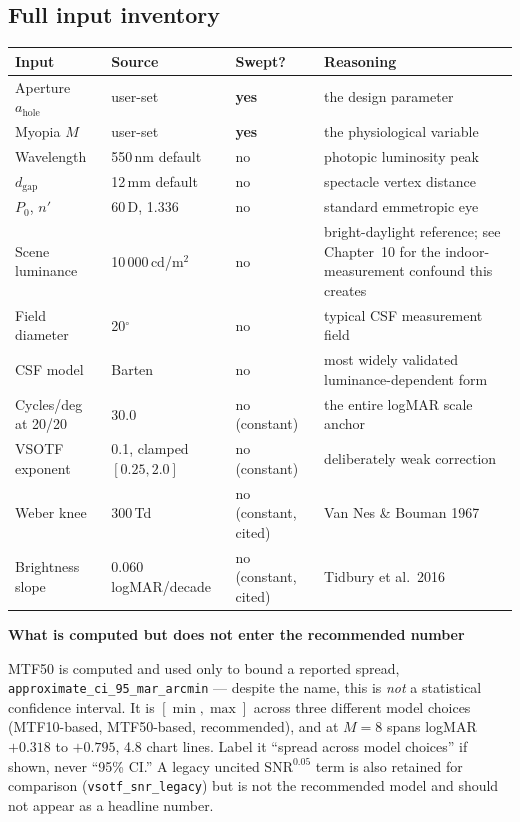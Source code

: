 \documentclass[11pt]{report}
\newenvironment{warnbox}[1]%
{\par\vspace{6pt}\begin{lrbox}{\wbsave}\begin{minipage}{0.88\textwidth}%
{\bfseries\color{warnred}#1}\par\vspace{4pt}\ignorespaces}%
{\end{minipage}\end{lrbox}%
\begin{center}\setlength{\fboxrule}{1.2pt}\setlength{\fboxsep}{7pt}%
\fcolorbox{warnred}{white}{\usebox{\wbsave}}\end{center}\vspace{6pt}\par}
\begin{document}
\subsection{Full input inventory}

\begin{center}
\begin{tabular}{p{3.2cm}p{2.6cm}p{2.4cm}p{4.6cm}}
\toprule
Input & Source & Swept? & Reasoning \\
\midrule
Aperture $a_{\text{hole}}$ & user-set & \textbf{yes} & the design parameter \\
Myopia $M$ & user-set & \textbf{yes} & the physiological variable \\
Wavelength & 550\,nm default & no & photopic luminosity peak \\
$d_{\text{gap}}$ & 12\,mm default & no & spectacle vertex distance \\
$P_0$, $n'$ & 60\,D, 1.336 & no & standard emmetropic eye \\
Scene luminance & 10\,000\,cd/m$^2$ & no & bright-daylight reference; see Chapter~10 for the
indoor-measurement confound this creates \\
Field diameter & 20$^\circ$ & no & typical CSF measurement field \\
CSF model & Barten & no & most widely validated luminance-dependent form \\
Cycles/deg at 20/20 & 30.0 & no (constant) & the entire logMAR scale anchor \\
VSOTF exponent & 0.1, clamped $[0.25,2.0]$ & no (constant) & deliberately weak correction \\
Weber knee & 300\,Td & no (constant, cited) & Van Nes \& Bouman 1967 \\
Brightness slope & 0.060\,logMAR/decade & no (constant, cited) & Tidbury et al.\ 2016 \\
\bottomrule
\end{tabular}
\end{center}

\begin{warnbox}{What is computed but does not enter the recommended number}
MTF50 is computed and used only to bound a reported spread,
\texttt{approximate\_ci\_95\_mar\_arcmin} --- despite the name, this is \emph{not} a
statistical confidence interval. It is $[\min,\max]$ across three different model choices
(MTF10-based, MTF50-based, recommended), and at $M=8$ spans logMAR $+0.318$ to $+0.795$,
4.8 chart lines. Label it ``spread across model choices'' if shown, never ``95\% CI.'' A
legacy uncited $\text{SNR}^{0.05}$ term is also retained for comparison
(\texttt{vsotf\_snr\_legacy}) but is not the recommended model and should not appear as a
headline number.
\end{warnbox}
\end{document}
